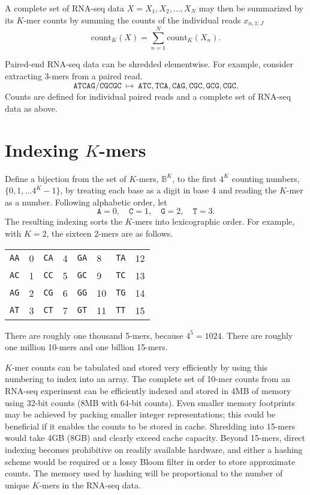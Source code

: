 \documentclass[11pt]{article}
\newcommand{\rob}[1]{\todo[inline]{\textbf{Robert: }#1}}
\begin{document}
A complete set of RNA-seq data $X = X_1, X_2, \ldots, X_N$ may then be summarized by its
$K$-mer counts by summing the counts of the individual reads $x_{n, 1:J}$
\[
  \textrm{count}_K(X) = \sum_{n=1}^N \textrm{count}_K(X_n).
\]

Paired-end RNA-seq data can be shredded elementwise.  For
example, consider extracting 3-mers from a paired read.
\[
  \texttt{ATCAG} / \texttt{CGCGC}
  \ \mapsto \
  \texttt{ATC}, \texttt{TCA}, \texttt{CAG},
  \texttt{CGC}, \texttt{GCG}, \texttt{CGC}.
\]
Counts are defined for individual paired reads and a complete set of
RNA-seq data as above.

\section{Indexing $K$-mers}

Define a bijection from the set of $K$-mers, $\mathbb{B}^K$, to the
first $4^K$ counting numbers, $\{ 0, 1, \ldots 4^K-1 \}$,
by treating each base as a digit in base 4 and reading the
$K$-mer as a number.  Following alphabetic order, let
\[
  \texttt{A} = 0,
  \quad \texttt{C} = 1,
  \quad \texttt{G} = 2,
  \quad \texttt{T} = 3.
\]
The resulting indexing sorts the $K$-mers into lexicographic order.
For example, with $K = 2$, the sixteen 2-mers are as follows.

\begin{center}
\begin{tabular}{ll|ll|ll|ll}
  \texttt{AA} & 0 & \texttt{CA} & 4 &   \texttt{GA} & 8 & \texttt{TA} & 12
  \\
  \texttt{AC} & 1 & \texttt{CC} & 5 &   \texttt{GC} & 9 & \texttt{TC} & 13
  \\
  \texttt{AG} & 2 & \texttt{CG} & 6 &   \texttt{GG} & 10 & \texttt{TG} & 14
  \\
  \texttt{AT} & 3 & \texttt{CT} & 7 &   \texttt{GT} & 11 & \texttt{TT} & 15
\end{tabular}
\end{center}
There are roughly one thousand 5-mers, because $4^5 = 1024$.  There are
roughly one million 10-mers and one billion 15-mers.

$K$-mer counts can be tabulated and stored very efficiently by using
this numbering to index into an array.  The complete set of 10-mer
counts from an RNA-seq experiment can be efficiently indexed and
stored in 4MB of memory using 32-bit counts (8MB with 64-bit counts).
Even smaller memory footprints may be achieved by packing smaller
integer representations; this could be beneficial if it enables the
counts to be stored in cache.  Shredding into 15-mers would take 4GB
(8GB) and clearly exceed cache capacity.  Beyond 15-mers, direct
indexing becomes prohibitive on readily available hardware, and either
a hashing scheme would be required or a lossy Bloom filter in order to
store approximate counts.  The memory used by hashing will be
proportional to the number of unique $K$-mers in the RNA-seq data.
\end{document}
